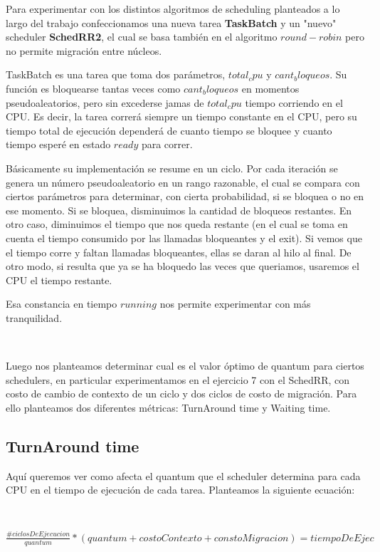 Para experimentar con los distintos algoritmos de scheduling planteados a lo largo del trabajo confeccionamos una nueva tarea 
\textbf{TaskBatch} y un "nuevo" scheduler \textbf{SchedRR2}, el cual se basa también en el algoritmo $round-robin$ pero no permite migración entre núcleos.

TaskBatch es una tarea que toma dos parámetros, $total_cpu$ y $cant_bloqueos$. Su función es bloquearse tantas veces como $cant_bloqueos$ en momentos pseudoaleatorios, pero sin excederse jamas de $total_cpu$ tiempo corriendo en el CPU. Es decir, la tarea correrá siempre un tiempo constante en el CPU, pero su tiempo total de ejecución dependerá de cuanto tiempo se bloquee y cuanto tiempo esperé en estado $ready$ para correr.

Básicamente su implementación se resume en un ciclo. Por cada iteración se genera un número pseudoaleatorio en un rango razonable, el cual se compara con ciertos parámetros para determinar, con cierta probabilidad, si se bloquea o no en ese momento. Si se bloquea, disminuimos la cantidad de bloqueos restantes. En otro caso, diminuimos el tiempo que nos queda restante (en el cual se toma en cuenta el tiempo consumido por las llamadas bloqueantes y el exit). Si vemos que el tiempo corre y faltan llamadas bloqueantes, ellas se daran al hilo al final. De otro modo, si resulta que ya se ha bloquedo las veces que queriamos, usaremos el CPU el tiempo restante.

Esa constancia en tiempo $running$ nos permite experimentar con más tranquilidad.

~

Luego nos planteamos determinar cual es el valor óptimo de quantum para ciertos schedulers, en particular experimentamos en el ejercicio 7 con el SchedRR, con costo de cambio de contexto de un ciclo y dos ciclos de costo de migración. Para ello planteamos dos diferentes métricas: TurnAround time y Waiting time.

\subsection{TurnAround time}

Aquí queremos ver como afecta el quantum que el scheduler determina para cada CPU en el tiempo de ejecución de cada tarea. Planteamos la siguiente ecuación:

~

$\frac{\#ciclosDeEjecucion}{quantum} * (quantum + costoContexto + constoMigracion) = tiempoDeEjec$

